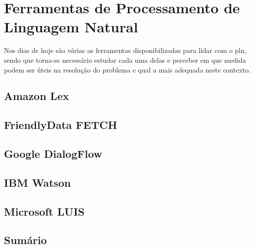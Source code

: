 \section{Ferramentas de Processamento de Linguagem Natural}
\label{sec:chap03_existingtools}
Nos dias de hoje são várias as ferramentas disponibilizadas para lidar com o \gls{pln}, sendo que torna-se necessário estudar cada uma delas e perceber em que medida podem ser úteis na resolução do problema e qual a mais adequada neste contexto.

\subsection{Amazon Lex}
\tbd

\subsection{FriendlyData FETCH}
\tbd

\subsection{Google DialogFlow}
\tbd

\subsection{IBM Watson}
\tbd

\subsection{Microsoft LUIS}
\tbd

\subsection{Sumário}
\tbd